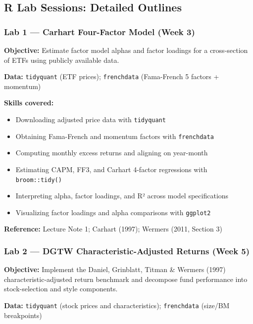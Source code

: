 \documentclass[
  12pt,
  letterpaper,
  DIV=11,
  numbers=noendperiod]{scrartcl}
\providecommand{\tightlist}{%
  \setlength{\itemsep}{0pt}\setlength{\parskip}{0pt}}
\begin{document}
\subsection{R Lab Sessions: Detailed
Outlines}\label{r-lab-sessions-detailed-outlines}

\subsubsection{Lab 1 --- Carhart Four-Factor Model (Week
3)}\label{lab-1-carhart-four-factor-model-week-3}

\textbf{Objective:} Estimate factor model alphas and factor loadings for
a cross-section of ETFs using publicly available data.

\textbf{Data:} \texttt{tidyquant} (ETF prices); \texttt{frenchdata}
(Fama-French 5 factors + momentum)

\textbf{Skills covered:}

\begin{itemize}
\tightlist
\item
  Downloading adjusted price data with \texttt{tidyquant}
\item
  Obtaining Fama-French and momentum factors with \texttt{frenchdata}
\item
  Computing monthly excess returns and aligning on year-month
\item
  Estimating CAPM, FF3, and Carhart 4-factor regressions with
  \texttt{broom::tidy()}
\item
  Interpreting alpha, factor loadings, and R² across model
  specifications
\item
  Visualizing factor loadings and alpha comparisons with
  \texttt{ggplot2}
\end{itemize}

\textbf{Reference:} Lecture Note 1; Carhart (1997); Wermers (2011,
Section 3)

\subsubsection{Lab 2 --- DGTW Characteristic-Adjusted Returns (Week
5)}\label{lab-2-dgtw-characteristic-adjusted-returns-week-5}

\textbf{Objective:} Implement the Daniel, Grinblatt, Titman \& Wermers
(1997) characteristic-adjusted return benchmark and decompose fund
performance into stock-selection and style components.

\textbf{Data:} \texttt{tidyquant} (stock prices and characteristics);
\texttt{frenchdata} (size/BM breakpoints)
\end{document}
